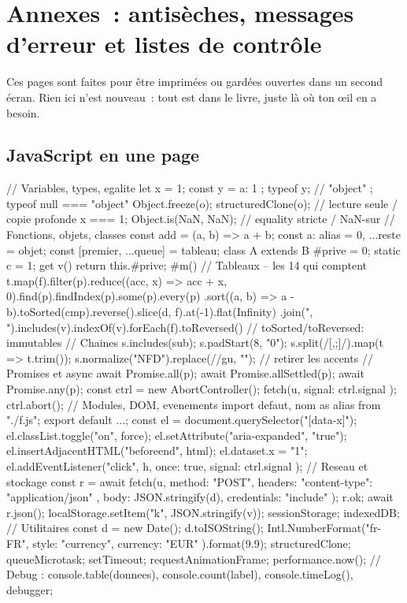 \chapter*{Annexes~: antis\`eches, messages d'erreur et listes de contr\^ole}
\label{ch-antisecche}

Ces pages sont faites pour \^etre imprim\'ees ou gard\'ees ouvertes dans un second \'ecran.
Rien ici n'est nouveau~: tout est dans le livre, juste l\`a o\`u ton \oe{}il en a besoin.

\section{JavaScript en une page}

\begin{codejs}
// Variables, types, egalite
let x = 1; const y = { a: 1 }; typeof y;               // "object" ; typeof null === "object"
Object.freeze(o); structuredClone(o);                   // lecture seule / copie profonde
x === 1; Object.is(NaN, NaN);                           // equality stricte / NaN-sur
// Fonctions, objets, classes
const add = (a, b) => a + b;
const { a: alias = 0, ...reste } = objet;
const [premier, ...queue] = tableau;
class A extends B { #prive = 0; static c = 1; get v() { return this.#prive; } #m() { } }
// Tableaux -- les 14 qui comptent
t.map(f).filter(p).reduce((acc, x) => acc + x, 0).find(p).findIndex(p).some(p).every(p)
 .sort((a, b) => a - b).toSorted(cmp).reverse().slice(d, f).at(-1).flat(Infinity)
 .join(", ").includes(v).indexOf(v).forEach(f).toReversed()   // toSorted/toReversed: immutables
// Chaines
s.includes(sub); s.padStart(8, "0"); s.split(/[,;]/).map(t => t.trim());
s.normalize("NFD").replace(//gu, "");      // retirer les accents
// Promises et async
await Promise.all(p); await Promise.allSettled(p); await Promise.any(p);
const ctrl = new AbortController(); fetch(u, { signal: ctrl.signal }); ctrl.abort();
// Modules, DOM, evenements
import defaut, { nom as alias } from "./f.js"; export default ...;
const el = document.querySelector("[data-x]");
el.classList.toggle("on", force); el.setAttribute("aria-expanded", "true");
el.insertAdjacentHTML("beforeend", html); el.dataset.x = "1";
el.addEventListener("click", h, { once: true, signal: ctrl.signal });
// Reseau et stockage
const r = await fetch(u, { method: "POST", headers: { "content-type": "application/json" },
  body: JSON.stringify(d), credentials: "include" }); r.ok; await r.json();
localStorage.setItem("k", JSON.stringify(v)); sessionStorage; indexedDB;
// Utilitaires
const d = new Date(); d.toISOString(); Intl.NumberFormat("fr-FR", { style: "currency", currency: "EUR" }).format(9.9);
structuredClone; queueMicrotask; setTimeout; requestAnimationFrame; performance.now();
// Debug : console.table(donnees), console.count(label), console.timeLog(), debugger;
\end{codejs}

